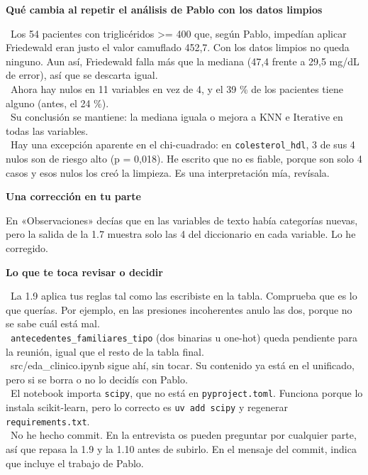 \documentclass[11pt,a4paper]{article}
\begin{document}
{\textbf{Qué cambia al repetir el análisis de Pablo con los datos limpios}

\hspace*{1.0em}\textbullet~Los 54 pacientes con triglicéridos \textgreater{}= 400 que, según Pablo, impedían aplicar Friedewald eran justo el valor camuflado 452,7. Con los datos limpios no queda ninguno. Aun así, Friedewald falla más que la mediana (47,4 frente a 29,5 mg/\allowbreak{}dL de error), así que se descarta igual. \\{}
\hspace*{1.0em}\textbullet~Ahora hay nulos en 11 variables en vez de 4, y el 39 \% de los pacientes tiene alguno (antes, el 24 \%). \\{}
\hspace*{1.0em}\textbullet~Su conclusión se mantiene: la mediana iguala o mejora a KNN e Iterative en todas las variables. \\{}
\hspace*{1.0em}\textbullet~Hay una excepción aparente en el chi-cuadrado: en \texttt{colesterol\_\allowbreak{}hdl}, 3 de sus 4 nulos son de riesgo alto (p = 0,018). He escrito que no es fiable, porque son solo 4 casos y esos nulos los creó la limpieza. Es una interpretación mía, revísala.

\textbf{Una corrección en tu parte}

En «Observaciones» decías que en las variables de texto había categorías nuevas, pero la salida de la 1.7 muestra solo las 4 del diccionario en cada variable. Lo he corregido.

\textbf{Lo que te toca revisar o decidir}

\hspace*{1.0em}\textbullet~La 1.9 aplica tus reglas tal como las escribiste en la tabla. Comprueba que es lo que querías. Por ejemplo, en las presiones incoherentes anulo las dos, porque no se sabe cuál está mal. \\{}
\hspace*{1.0em}\textbullet~\texttt{antecedentes\_\allowbreak{}familiares\_\allowbreak{}tipo} (dos binarias u one-hot) queda pendiente para la reunión, igual que el resto de la tabla final. \\{}
\hspace*{1.0em}\textbullet~src/\allowbreak{}eda\_\allowbreak{}clinico.ipynb sigue ahí, sin tocar. Su contenido ya está en el unificado, pero si se borra o no lo decidís con Pablo. \\{}
\hspace*{1.0em}\textbullet~El notebook importa \texttt{scipy}, que no está en \texttt{pyproject.toml}. Funciona porque lo instala scikit-learn, pero lo correcto es \texttt{uv add scipy} y regenerar \texttt{requirements.txt}. \\{}
\hspace*{1.0em}\textbullet~No he hecho commit. En la entrevista os pueden preguntar por cualquier parte, así que repasa la 1.9 y la 1.10 antes de subirlo. En el mensaje del commit, indica que incluye el trabajo de Pablo.

}
\end{document}
